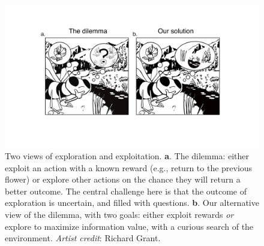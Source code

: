 \begin{figure}
	\includegraphics[width=.9\linewidth]{img/bee.pdf} 
	\caption{Two views of exploration and exploitation. \textbf{a}. The dilemma: either exploit an action with a known reward (e.g., return to the previous flower) or explore other actions on the chance they will return a better outcome. The central challenge here is that the outcome of exploration is uncertain, and filled with questions. \textbf{b}. Our alternative view of the dilemma, with two goals: either exploit rewards \textit{or} explore to maximize information value, with a curious search of the environment. \textit{Artist credit}: Richard Grant.}
	\label{fig:bee} 
\end{figure}
